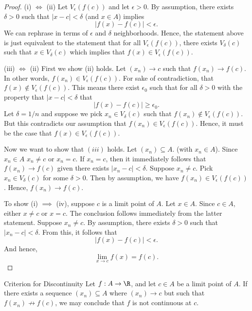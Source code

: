 \begin{proof}
    (i) \( \iff \) (ii) Let \( V_{\epsilon}(f(c)) \) and let \( \epsilon > 0  \). By assumption, there exists \( \delta > 0  \) such that \( | x - c  | < \delta \) (and \( x \in A  \)) implies 
    \[ | f(x) - f(c) | < \epsilon. \]
    We can rephrase in terms of \( \epsilon  \) and \( \delta \) neighborhoods. Hence, the statement above is just equivalent to the statement that for all \( V_{\epsilon }(f(c)) \), there exists \( V_{\delta}(c) \) such that \( x \in V_{\delta}(c) \) which implies that \( f(x) \in V_{\epsilon }(f(c)) \). 

     (iii) \( \iff \) (ii)  First we show (ii) holds. Let \( (x_n) \to c  \) such that \( f(x_n) \to f(c)  \). In other words, \( f(x_n) \in V_{\epsilon }(f(c)) \). For sake of contradiction, that \( f(x) \notin V_{\epsilon }(f(c)) \). This means there exist \( \epsilon_0  \) such that for all \( \delta > 0  \) with the property that \( | x - c  | < \delta \) that 
    \[  | f(x) - f(c)  | \geq \epsilon_0. \] Let \( \delta = 1 / n  \) and suppose we pick \( x_n \in V_{\delta}(c) \) such that \( f(x_n) \notin V_{\epsilon }(f(c)) \). But this contradicts our assumption that \( f(x_n) \in V_{\epsilon }(f(c)) \). Hence, it must be the case that \( f(x) \in V_{\epsilon }(f(c)) \).

    Now we want to show that \( (iii) \) holds. Let \( (x_n) \subseteq A  \).
    (with \( x_n \in A  \)). Since \( x_n \in A  \) \( x_n \neq c  \) or \( x_n = c  \). If \( x_n = c  \), then it immediately follows that \( f(x_n) \to f(c) \) given there exists \( | x_n  - c | < \delta \). Suppose \( x_n \neq c  \). Pick \( x_n \in V_{\delta}(c) \) for some \( \delta > 0  \). Then by assumption, we have \( f(x_n) \in V_{\epsilon }(f(c)) \). Hence, \( f(x_n) \to f(c) \).

    To show (i) \( \implies \) (iv), suppose \( c  \) is a limit point of \( A  \). Let \( x \in A  \). Since \( c \in A \), either \( x \neq c  \) or \( x = c  \). The conclusion follows immediately from the latter statement. Suppose \( x_n \neq c  \). By assumption, there exists \( \delta > 0  \) such that \( | x_n -c  | < \delta \). From this, it follows that 
    \[  |  f(x) - f(c)  | < \epsilon. \]
    And hence, 
    \[ \lim_{ x \to c } f(x) = f(c). \]
\end{proof}

\begin{cor}{Criterion for Discontinuity}{}
    Let \( f: A \to \R  \), and let \( c \in A  \) be a limit point of \( A  \). If there exists a sequence \( (x_n) \subseteq A  \) where \( (x_n) \to c  \) but such that \( f(x_n) \not \to f(c) \), we may conclude that \( f \) is not continuous at \( c \).
    \end{cor}

